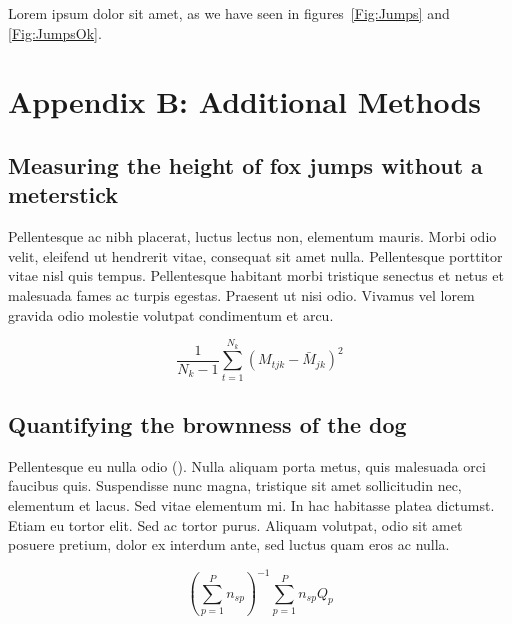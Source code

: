 \documentclass[11pt]{article}
\begin{document}
Lorem ipsum dolor sit amet, as we have seen in figures~\ref{Fig:Jumps} and \ref{Fig:JumpsOk}.

\newpage{}

\section*{Appendix B: Additional Methods}

\subsection*{Measuring the height of fox jumps without a meterstick}

Pellentesque ac nibh placerat, luctus lectus non, elementum mauris. 
Morbi odio velit, eleifend ut hendrerit vitae, consequat sit amet 
nulla. Pellentesque porttitor vitae nisl quis tempus. Pellentesque 
habitant morbi tristique senectus et netus et malesuada fames ac 
turpis egestas. Praesent ut nisi odio. Vivamus vel lorem gravida 
odio molestie volutpat condimentum et arcu. 

\begin{equation}
{ \frac{1}{N_k-1} \sum \limits_{t=1}^{N_k} (M_{tjk} - \bar{M}_{jk})^2}
\end{equation}

\subsection*{Quantifying the brownness of the dog}

Pellentesque eu nulla odio (\citealt{Xiao2015,CookEtAl2015}). Nulla aliquam porta metus, quis malesuada orci faucibus quis. Suspendisse nunc magna, tristique sit amet sollicitudin nec, elementum et lacus. Sed vitae elementum mi. In hac habitasse platea dictumst. Etiam eu tortor elit. Sed ac tortor purus. Aliquam volutpat, odio sit amet posuere pretium, dolor ex interdum ante, sed luctus quam eros ac nulla. 

\begin{equation}
{ (\sum \limits_{p=1}^P {n_{sp}})^{-1}\sum \limits_{p=1}^P {n_{sp}Q_{p}}}
\end{equation}

\newpage{}

\end{document}
